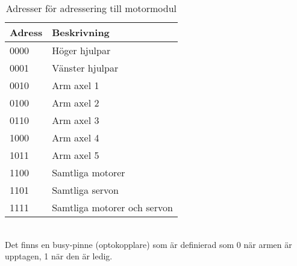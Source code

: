 \begin{table}[h]
	\centering
		\begin{tabularx}{\textwidth}{| l | X |}
			\hline
			\textbf{Adress} & \textbf{Beskrivning} \\
			\hline
			{0000} & {Höger hjulpar} \\
			\hline
			{0001} & {Vänster hjulpar} \\
			\hline
			{0010} & {Arm axel 1} \\ %
			\hline
			{0100} & {Arm axel 2} \\
			\hline
			{0110} & {Arm axel 3} \\
			\hline
			{1000} & {Arm axel 4} \\
			\hline
			{1011} & {Arm axel 5} \\ %
			\hline
			{1100} & {Samtliga motorer} \\
			\hline
			{1101} & {Samtliga servon} \\
			\hline
			{1111} & {Samtliga motorer och servon} \\
			\hline
		\end{tabularx}
	\caption{Adresser för adressering till motormodul} \label{protokoll:pc-motor-adress-tabell}
\end{table}
 \\

Det finns en busy-pinne (optokopplare) som är definierad som 0 när armen är upptagen, 1 när den är ledig. 